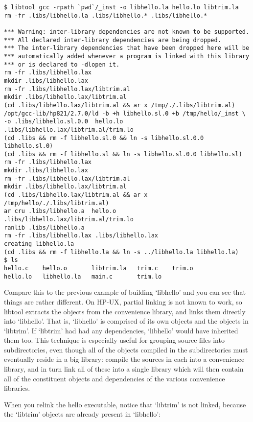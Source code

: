 \begin{Verbatim}
$ libtool gcc -rpath `pwd`/_inst -o libhello.la hello.lo libtrim.la
rm -fr .libs/libhello.la .libs/libhello.* .libs/libhello.*

*** Warning: inter-library dependencies are not known to be supported.
*** All declared inter-library dependencies are being dropped.
*** The inter-library dependencies that have been dropped here will be
*** automatically added whenever a program is linked with this library
*** or is declared to -dlopen it.
rm -fr .libs/libhello.lax
mkdir .libs/libhello.lax
rm -fr .libs/libhello.lax/libtrim.al
mkdir .libs/libhello.lax/libtrim.al
(cd .libs/libhello.lax/libtrim.al && ar x /tmp/./.libs/libtrim.al)
/opt/gcc-lib/hp821/2.7.0/ld -b +h libhello.sl.0 +b /tmp/hello/_inst \
-o .libs/libhello.sl.0.0  hello.lo .libs/libhello.lax/libtrim.al/trim.lo
(cd .libs && rm -f libhello.sl.0 && ln -s libhello.sl.0.0 libhello.sl.0)
(cd .libs && rm -f libhello.sl && ln -s libhello.sl.0.0 libhello.sl)
rm -fr .libs/libhello.lax
mkdir .libs/libhello.lax
rm -fr .libs/libhello.lax/libtrim.al
mkdir .libs/libhello.lax/libtrim.al
(cd .libs/libhello.lax/libtrim.al && ar x /tmp/hello/./.libs/libtrim.al)
ar cru .libs/libhello.a  hello.o  .libs/libhello.lax/libtrim.al/trim.lo
ranlib .libs/libhello.a
rm -fr .libs/libhello.lax .libs/libhello.lax
creating libhello.la
(cd .libs && rm -f libhello.la && ln -s ../libhello.la libhello.la)
$ ls
hello.c    hello.o       libtrim.la   trim.c    trim.o
hello.lo   libhello.la   main.c       trim.lo
\end{Verbatim}

Compare this to the previous example of building `libhello' and you can see that things are rather different. On HP-UX, partial linking is not known to work, so libtool extracts the objects from the convenience library, and links them directly into `libhello'. That is, `libhello' is comprised of its own objects and the objects in `libtrim'. If `libtrim' had had any dependencies, `libhello' would have inherited them too. This technique is especially useful for grouping source files into subdirectories, even though all of the objects compiled in the subdirectories must eventually reside in a big library: compile the sources in each into a convenience library, and in turn link all of these into a single library which will then contain all of the constituent objects and dependencies of the various convenience libraries. 


When you relink the hello executable, notice that `libtrim' is not linked, because the `libtrim' objects are already present in `libhello': 


